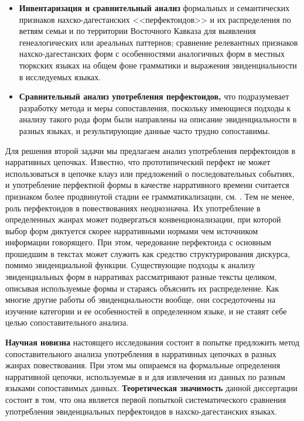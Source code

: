\begin{itemize}
    \item \textbf{Инвентаризация и сравнительный анализ} формальных и семантических признаков нахско-дагестанских <<перфектоидов>> и их распределения по ветвям семьи и по территории Восточного Кавказа для выявления генеалогических или ареальных паттернов; сравнение релевантных признаков нахско-дагестанских форм с особенностями аналогичных форм в местных тюркских языках на общем фоне грамматики и выражения эвиденциальности в исследуемых языках.
    \item \textbf{Сравнительный анализ употребления перфектоидов,} что подразумевает разработку метода и меры сопоставления, поскольку имеющиеся подходы к анализу такого рода форм были направлены на описание эвиденциальности в разных языках, и результирующие данные часто трудно сопоставимы.
\end{itemize}

Для решения второй задачи мы предлагаем анализ употребления перфектоидов в нарративных цепочках. Известно, что прототипический перфект не может использоваться в цепочке клауз или предложений о последовательных событиях, и употребление перфектной формы в качестве нарративного времени считается признаком более продвинутой стадии ее грамматикализации, см. \citep{lindstedt2000}. Тем не менее, роль перфектоидов в повествованиях неоднозначна. Их употребление в определенных жанрах может подвергаться конвенционализации, при которой выбор форм диктуется скорее нарративными нормами чем источником информации говорящего. При этом, чередование перфектоида с основным прошедшим в текстах может служить как средство структурирования дискурса, помимо эвиденциальной функции. Существующие подходы к анализу эвиденциальных форм в нарративах рассматривают разные тексты целиком, описывая используемые формы и стараясь объяснить их распределение. Как многие другие работы об эвиденциальности вообще, они сосредоточены на изучение категории и ее особенностей в определенном языке, и не ставят себе целью сопоставительного анализа.
\par \textbf{Научная новизна} настоящего исследования состоит в попытке предложить метод сопоставительного анализа употребления в нарративных цепочках в разных жанрах повествования. При этом мы опираемся на формальные определения нарративной цепочки, используемые в \citep{labovwaletzky1967} и \citep{paducheva2010} для извлечения из данных по разным языками сопоставимых данных. \textbf{Теоретическая значимость} данной диссертации состоит в том, что она является первой попыткой систематического сравнения употребления эвиденциальных перфектоидов в нахско-дагестанских языках.

